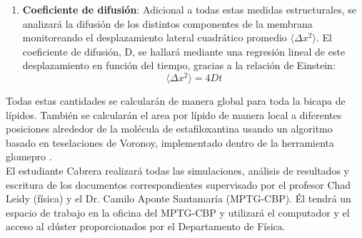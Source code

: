 \begin{enumerate}
\item \textbf{Coeficiente de difusión}: 
Adicional a todas estas medidas estructurales, se analizará la difusión de los distintos componentes de la membrana monitoreando el desplazamiento lateral cuadrático promedio $\langle\Delta x^2\rangle$. El coeficiente de difusión, D, se hallará mediante una regresión lineal de este desplazamiento en función del tiempo, gracias a la relación de Einstein:
\begin{equation}
\langle\Delta x^2\rangle= 4Dt
 \end{equation}
\end{enumerate}
Todas estas cantidades se calcularán de manera global para toda la bicapa de lípidos. También se calcularán el area por lípido de manera local a diferentes posiciones alrededor de la molécula de estafiloxantina usando un algoritmo basado en teselaciones de Voronoy, implementado dentro de la herramienta glomepro \cite{MelendezDelgado2018StudyingBilayers}.\\

El estudiante Cabrera realizará todas las simulaciones, análisis de resultados y escritura de los documentos correspondientes supervisado por el profesor Chad Leidy (física) y el Dr. Camilo Aponte Santamaría (MPTG-CBP). Él tendrá un espacio de trabajo en la oficina del MPTG-CBP y utilizará el computador y el acceso al clúster proporcionados por el Departamento de Física.